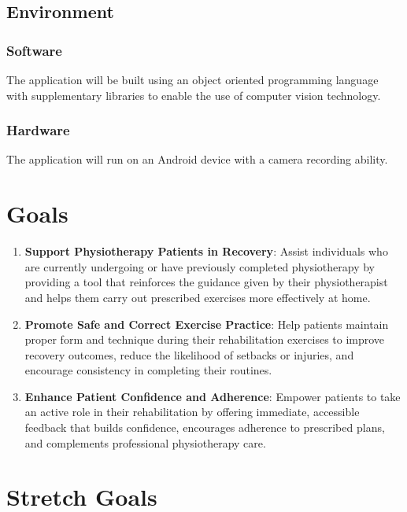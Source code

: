 \documentclass{article}
\begin{document}
\subsection{Environment}
  \subsubsection{Software}
    The application will be built using an object oriented programming language with supplementary libraries to enable the use of computer vision technology. \\
  \subsubsection{Hardware}
    The application will run on an Android device with a camera recording ability.

\section{Goals}

\begin{enumerate}
  \item \textbf{Support Physiotherapy Patients in Recovery}: Assist individuals who are currently undergoing or have previously completed physiotherapy by providing a tool that reinforces the guidance given by their physiotherapist and helps them carry out prescribed exercises more effectively at home.

  \item \textbf{Promote Safe and Correct Exercise Practice}: Help patients maintain proper form and technique during their rehabilitation exercises to improve recovery outcomes, reduce the likelihood of setbacks or injuries, and encourage consistency in completing their routines.

  \item \textbf{Enhance Patient Confidence and Adherence}: Empower patients to take an active role in their rehabilitation by offering immediate, accessible feedback that builds confidence, encourages adherence to prescribed plans, and complements professional physiotherapy care.

\end{enumerate}

\section{Stretch Goals}
\end{document}
